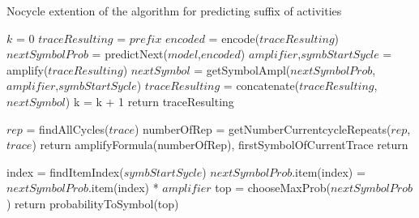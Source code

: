 \begin{algorithm}
	\caption{Nocycle extention of the algorithm for predicting suffix of activities}\label{AIPal}
	\begin{algorithmic}[1]
		\State $k$ = 0
		\State $traceResulting$ = $prefix$
		\Do
		\State $encoded$ = encode($traceResulting$)
		\State $nextSymbolProb$ = predictNext($model$,$encoded$)
		\State $amplifier$,$symbStartSycle$ = amplify($traceResulting$)
		\State $nextSymbol$ = getSymbolAmpl($nextSymbolProb$, $amplifier$,$symbStartSycle$)
		\State $traceResulting$ = concatenate($traceResulting$, $nextSymbol$)
		\State k = k + 1  
		\State return traceResulting
		\EndFunction
		
		\State $rep$ = findAllCycles($trace$)
		\State {} {
		\State numberOfRep = getNumberCurrentcycleRepeats($rep$,$trace$)
		\State return amplifyFormula(numberOfRep), firstSymbolOfCurrentTrace}
		\State return 
		\EndFunction

		\State index = findItemIndex($symbStartSycle$)
		\State $nextSymbolProb$.item(index) = $nextSymbolProb$.item(index) * $amplifier$
		\State top = chooseMaxProb($nextSymbolProb$)
		\State return probabilityToSymbol(top)
		\EndFunction
	\end{algorithmic}
	\label{alg:nocycle}
\end{algorithm}


 



